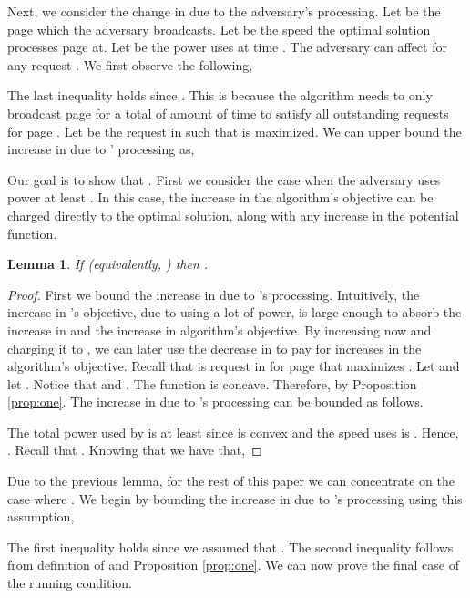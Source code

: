 \documentclass[11pt]{article}
\newtheorem{lemma}{Lemma}[section]
\begin{document}
Next, we consider the change in  due to the adversary's processing.  Let  be the page which the adversary broadcasts.  Let  be the speed the optimal solution processes page  at.  Let  be the power  uses at time .    The adversary can affect  for any request .  We first observe the following,



The last inequality holds since .  This is because the algorithm needs to only broadcast page  for a total of  amount of time to satisfy all outstanding requests for page . Let  be the request in  such that  is maximized.  We can upper bound the increase in  due to ' processing as,



Our goal is to show that .  First we consider the case when the adversary uses power at least .  In this case, the increase in the algorithm's objective can be charged directly to the optimal solution, along with any increase in the potential function.  


\begin{lemma}
\label{lem:optpower}
If  (equivalently, ) then .
\end{lemma}
\begin{proof}
First we bound the increase in  due to 's processing. Intuitively, the increase in 's objective, due to using a lot of power, is large enough to absorb the increase in  and  the increase in algorithm's  objective.  By increasing  now and charging it to , we can later use the decrease in  to pay for increases in the algorithm's objective. Recall that  is request in  for page  that maximizes .  Let  and let .    Notice that  and .    The function  is concave.  Therefore,  by Proposition \ref{prop:one}.  The increase in  due to 's processing can be bounded as follows.
   


The total power used by  is at least  since  is convex and the speed  uses is . Hence, . Recall that .  Knowing that  we have that,



\end{proof}


Due to the previous lemma, for the rest of this paper we can concentrate on the case where .  We begin by bounding the increase in  due to 's processing using this assumption,






The first inequality holds since we assumed that .  The second inequality follows from definition of  and Proposition \ref{prop:one}. We can now prove the final case of the running condition.
\end{document}
